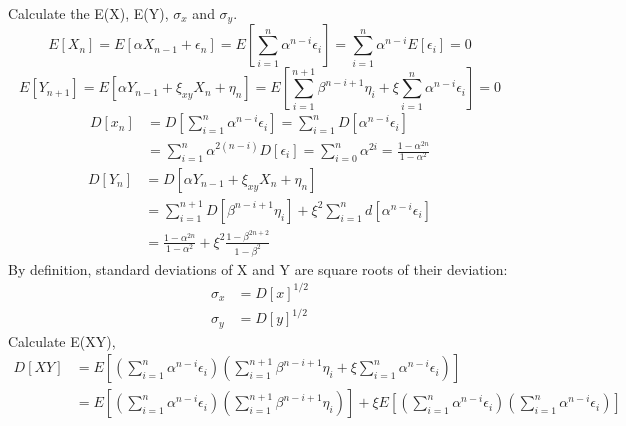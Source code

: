 \documentclass{article}
\begin{document}
		Calculate the E(X), E(Y), $\sigma_x$ and $\sigma_y$.
		\begin{equation}
			E[X_n] = E[\alpha X_{n-1}+\epsilon_n] = E[\sum^n_{i=1}\alpha^{n-i}\epsilon_i]=\sum^n_{i=1}\alpha^{n-i}E[\epsilon_i] = 0
		\end{equation}
		\begin{equation}
			E[Y_{n+1}] = E[\alpha Y_{n-1}+\xi_{xy}X_n + \eta_n] = E[\sum^{n +1}_{i=1}\beta^{n-i+1}\eta_i +\xi\sum^{n}_{i=1}\alpha^{n-i}\epsilon_i] = 0
		\end{equation}
		\begin{equation}
			\begin{aligned}
				D[x_n] & = D[\sum^n_{i=1}\alpha^{n-i}\epsilon_i] = \sum^n_{i=1}D[\alpha^{n-i}\epsilon_i] \\
				& = \sum^n_{i=1}\alpha^{2(n-i)}D[\epsilon_i] = \sum^n_{i=0}\alpha^{2i} = \frac{1 - \alpha^{2n}}{1-\alpha^2}
			\end{aligned}
		\end{equation}
		\begin{equation}
			\begin{aligned}
				D[Y_n] & = D[\alpha Y_{n-1} + \xi_{xy}X_n + \eta_n] \\
				& = \sum^{n + 1}_{i=1}D[\beta^{n - i + 1}\eta_i] +\xi^2\sum^{n}_{i=1}d[\alpha^{n - i}\epsilon_i] \\
				& = \frac{1 - \alpha^{2n}}{1-\alpha^2} + \xi^2\frac{1 - \beta^{2n+2}}{1-\beta^2}
			\end{aligned}
		\end{equation}
		By definition, standard deviations of X and Y are square roots of their deviation:
		\begin{equation}
			\begin{aligned}
				\sigma_x & = D[x]^{1/2} \\
				\sigma_y & = D[y]^{1/2}
			\end{aligned}
		\end{equation}
		Calculate E(XY),
		\begin{equation}
			\begin{aligned}
				D[XY] & = E[(\sum^n_{i=1}\alpha^{n-i}\epsilon_i)(\sum^{n +1}_{i=1}\beta^{n-i+1}\eta_i +\xi\sum^{n}_{i=1}\alpha^{n-i}\epsilon_i)] \\
				& = E[(\sum^n_{i=1}\alpha^{n-i}\epsilon_i)(\sum^{n +1}_{i=1}\beta^{n-i+1}\eta_i)] + \xi E[(\sum^n_{i=1}\alpha^{n-i}\epsilon_i)(\sum^{n}_{i=1}\alpha^{n-i}\epsilon_i)]
			\end{aligned}
		\end{equation}
\end{document}
